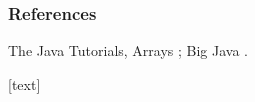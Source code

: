 \documentclass[aspectratio=169,10pt,compress]{beamer}
\begin{document}
\begin{frame}[t,fragile] \frametitle{References}
	\small The Java Tutorials, Arrays \cite{TheJavaTutorialsArray}; Big Java \cite{horstmann2016big}.

	\vspace{1em}
	[text]
	
	\tiny
\end{frame}




\begin{frame}[t,fragile]
	\begin{center}
		\vspace{4cm}
	\end{center}
\end{frame}
\end{document}
